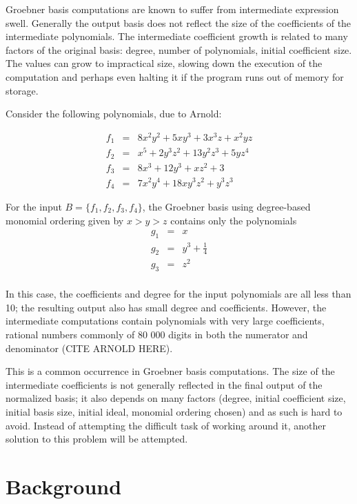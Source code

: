 \documentclass[letterpaper,12pt,titlepage,oneside,final]{book}
\begin{document}
Groebner basis computations are known to suffer from intermediate expression swell.  Generally the output basis does not reflect the size of the coefficients of the intermediate polynomials.  The intermediate coefficient growth is related to many factors of the original basis: degree, number of polynomials, initial coefficient size.  The values can grow to impractical size, slowing down the execution of the computation and perhaps even halting it if the program runs out of memory for storage.  

Consider the following polynomials, due to Arnold: %

\begin{eqnarray*}
  f_1 &=& 8x^2y^2 + 5xy^3 + 3x^3z + x^2yz\\
  f_2 &=& x^5 + 2y^3z^2 + 13y^2z^3 + 5yz^4\\ 
  f_3 &=& 8x^3 + 12y^3 + xz^2 + 3\\
  f_4 &=& 7x^2y^4 + 18xy^3z^2 + y^3z^3
\end{eqnarray*} 

For the input ${B = \{f_1, f_2, f_3, f_4\}}$, the Groebner basis using degree-based monomial ordering given by ${x > y > z}$ contains only the polynomials
\begin{eqnarray*}
  g_1 &=& x\\
  g_2 &=& y^3 + \frac{1}{4}\\ 
  g_3 &=& z^2\\
\end{eqnarray*} 

In this case, the coefficients and degree for the input polynomials are all less than 10; the resulting output also has small degree and coefficients.  However, the intermediate computations contain polynomials with very large coefficients, rational numbers commonly of 80 000 digits in both the numerator and denominator (CITE ARNOLD HERE).  

This is a common occurrence in Groebner basis computations.  The size of the intermediate coefficients is not generally reflected in the final output of the normalized basis; it also depends on many factors (degree, initial coefficient size, initial basis size, initial ideal, monomial ordering chosen) and as such is hard to avoid.  Instead of attempting the difficult task of working around it, another solution to this problem will be attempted.



\chapter{Background}\label{chpt:bg}
\end{document}
